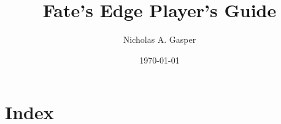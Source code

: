 \documentclass[11pt,twoside,openany]{book}
\title{Fate's Edge Player's Guide}
\author{Nicholas A. Gasper}
\date{\today}
\begin{document}
\frontmatter
\maketitle
\tableofcontents

\mainmatter




























\backmatter
\section*{Index}
\printindex
\end{document}
